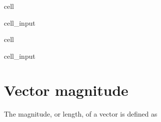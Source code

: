 \documentclass[letterpaper,10pt,english]{jupyterBook}
\begin{document}
\begin{sphinxuseclass}{cell}\begin{sphinxVerbatimInput}

\begin{sphinxuseclass}{cell_input}
\begin{sphinxVerbatim}[commandchars=\\\{\}]
\PYG{p}{[}\PYG{p}{]}\PYG{p}{[}\PYG{p}{]}\PYG{p}{[}\PYG{p}{]}
\end{sphinxVerbatim}

\end{sphinxuseclass}\end{sphinxVerbatimInput}

\end{sphinxuseclass}
\begin{sphinxuseclass}{cell}\begin{sphinxVerbatimInput}

\begin{sphinxuseclass}{cell_input}
\begin{sphinxVerbatim}[commandchars=\\\{\}]
    \PYG{p}{[}\PYG{p}{]}\PYG{p}{[}\PYG{p}{]}
 
\end{sphinxVerbatim}

\end{sphinxuseclass}\end{sphinxVerbatimInput}

\end{sphinxuseclass}

\section{Vector magnitude}
\label{\detokenize{lessons/Matrices-student:vector-magnitude}}
\sphinxAtStartPar
The magnitude, or length, of a vector is defined as
\end{document}
